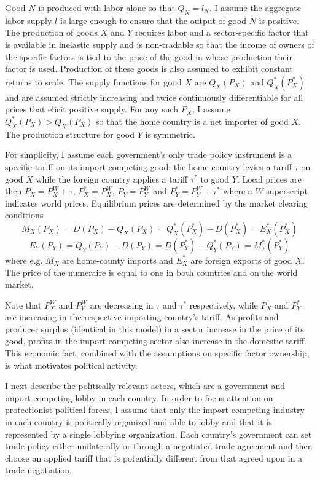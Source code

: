 \documentclass[12pt]{article}
\begin{document}
Good $N$ is produced with labor alone so that $Q_N = l_N$. I assume the aggregate labor supply $l$ is large enough to ensure that the output of good $N$ is positive. The production of goods $X$ and $Y$ requires labor and a sector-specific factor that is available in inelastic supply and is non-tradable so that the income of owners of the specific factors is tied to the price of the good in whose production their factor is used. Production of these goods is also assumed to exhibit constant returns to scale. The supply functions for good $X$ are $Q_X(P_X)$ and $Q_X^*(P_X^*)$ and are assumed strictly increasing and twice continuously differentiable for all prices that elicit positive supply. For any such $P_X$, I assume $Q_X^*(P_X) > Q_X(P_X)$ so that the home country is a net importer of good $X$. The production structure for good $Y$ is symmetric. 

For simplicity, I assume each government's only trade policy instrument is a specific tariff on its import-competing good: the home country levies a tariff $\tau$ on good $X$ while the foreign country applies a tariff $\tau^*$ to good $Y$. Local prices are then $P_X = P_X^W + \tau$, $P_X^* = P_X^W$, $P_Y = P_Y^W$ and $P_Y^* = P_Y^W + \tau^*$ where a $W$ superscript indicates world prices. Equilibrium prices are determined by the market clearing conditions
$$M_X(P_X)= D(P_X)-Q_X(P_X) = Q_X^*(P_X^*) - D(P_X^*) = E_X^*(P_X^*)$$
$$E_Y(P_Y)=Q_Y(P_Y)-D(P_Y) = D(P_Y^*)-Q_Y^*(P_Y) = M_Y^*(P_Y^*)$$
where e.g. $M_X$ are home-county imports and $E_X^*$ are foreign exports of good $X$. The price of the numeraire is equal to one in both countries and on the world market.

Note that $P_X^W$ and $P_Y^W$ are decreasing in $\tau$ and $\tau^*$ respectively, while $P_X$ and $P_Y^*$ are increasing in the respective importing country's tariff. As profits and producer surplus (identical in this model) in a sector increase in the price of its good, profits in the import-competing sector also increase in the domestic tariff. This economic fact, combined with the assumptions on specific factor ownership, is what motivates political activity.

I next describe the politically-relevant actors, which are a government and import-competing lobby in each country. In order to focus attention on protectionist political forces, I assume that only the import-competing industry in each country is politically-organized and able to lobby and that it is represented by a single lobbying organization. Each country's government can set trade policy either unilaterally or through a negotiated trade agreement and then choose an applied tariff that is potentially different from that agreed upon in a trade negotiation.
\end{document}
